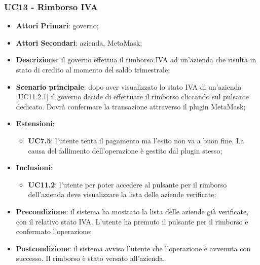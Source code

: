 \subsubsection{UC13 - Rimborso IVA}
\begin{itemize}
	\item \textbf{Attori Primari}:
	governo;
	\item \textbf{Attori Secondari}:
	azienda, MetaMask\glo;
	\item \textbf{Descrizione}: il governo effettua il rimborso IVA ad un'azienda che risulta in stato di credito al momento del saldo trimestrale;
	\item \textbf{Scenario principale}: dopo aver visualizzato lo stato IVA di un'azienda [UC11.2.1] il governo decide di effettuare il rimborso cliccando sul pulsante dedicato. Dovrà confermare la transazione attraverso il plugin MetaMask\glo;
	\item \textbf{Estensioni}: 
	\begin{itemize}
		\item \textbf{UC7.5}: l'utente tenta il pagamento ma l'esito non va a buon fine. La causa del fallimento dell'operazione è gestito dal plugin stesso;
	\end{itemize}
	\item \textbf{Inclusioni}: 
	\begin{itemize}
		\item \textbf{UC11.2}: l'utente per poter accedere al pulsante per il rimborso dell'azienda deve visualizzare la lista delle aziende verificate;
	\end{itemize}
	\item \textbf{Precondizione}: il sistema ha mostrato la lista delle aziende già verificate, con il relativo stato IVA. L'utente ha premuto il pulsante per il rimborso e confermato l'operazione;
	\item \textbf{Postcondizione}: il sistema avvisa l'utente che l'operazione è avvenuta con successo. Il rimborso è stato versato all'azienda.
\end{itemize} 
